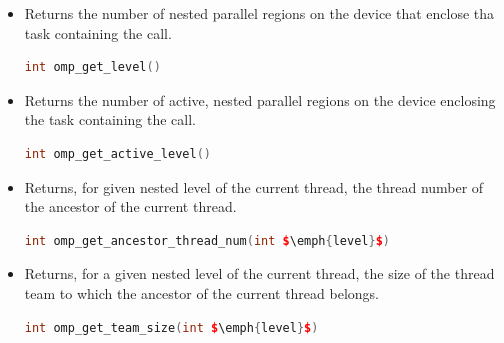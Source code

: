 \begin{itemize}
    \newpage

    \item Returns the number of nested parallel regions on the device that enclose tha task containing the call.
    \begin{openmpbox}
        \begin{lstlisting}[language=C++]
int omp_get_level()\end{lstlisting}
    \end{openmpbox}
    
    \item Returns the number of active, nested parallel regions on the device enclosing the task containing the call.
    \begin{openmpbox}
        \begin{lstlisting}[language=C++]
int omp_get_active_level()\end{lstlisting}
    \end{openmpbox}
    
    \item Returns, for given nested level of the current thread, the thread number of the ancestor of the current thread.
    \begin{openmpbox}
        \begin{lstlisting}[language=C++]
int omp_get_ancestor_thread_num(int $\emph{level}$)\end{lstlisting}
    \end{openmpbox}
    
    \item Returns, for a given nested level of the current thread, the size of the thread team to which the ancestor of the current thread belongs.
    \begin{openmpbox}
        \begin{lstlisting}[language=C++]
int omp_get_team_size(int $\emph{level}$)\end{lstlisting}
    \end{openmpbox}
\end{itemize}